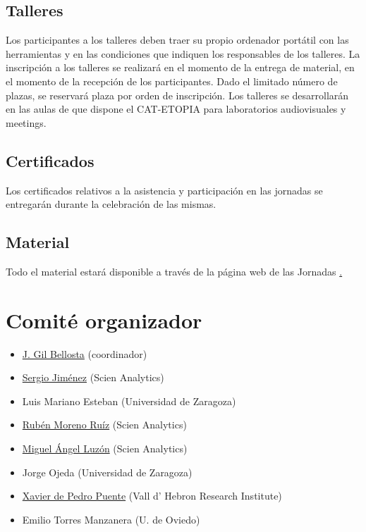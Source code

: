 \section{Talleres}

Los participantes a los talleres deben traer su propio ordenador portátil 
con las herramientas y en las condiciones que indiquen los responsables de 
los talleres. La inscripción a los talleres se realizará en el momento de 
la entrega de material, en el momento de la recepción de los participantes. 
Dado el limitado número de plazas, se reservará plaza por orden de inscripción. 
Los talleres se desarrollarán en las aulas de que dispone el CAT-ETOPIA 
para laboratorios audiovisuales y meetings.


\section{Certificados}

Los certificados relativos a la asistencia y participación en las jornadas
se entregarán durante la celebración de las mismas.


\section{Material}

Todo el material estará disponible a través de la página web de las Jornadas 
\href{http://r-es.org/V+Jornadas}. 



\chapter{Comité organizador}

\begin{itemize}

\item \href{http://www.datanalytics.com}{J. Gil Bellosta} (coordinador)
\item \href{http://www.scien-analytics.com}{Sergio Jiménez} (Scien Analytics)
\item Luis Mariano Esteban (Universidad de Zaragoza)
\item \href{http://www.scien-analytics.com}{Rubén Moreno Ruíz} (Scien Analytics)
\item \href{[http://www.scien-analytics.com}{Miguel Ángel Luzón} (Scien Analytics)
\item Jorge Ojeda (Universidad de Zaragoza)
\item \href{http://ueb.vhir.org|Vall d'Hebron Research Institute}{Xavier de Pedro Puente} (Vall d' Hebron Research Institute)
\item  Emilio Torres Manzanera (U. de Oviedo)
\end{itemize}

